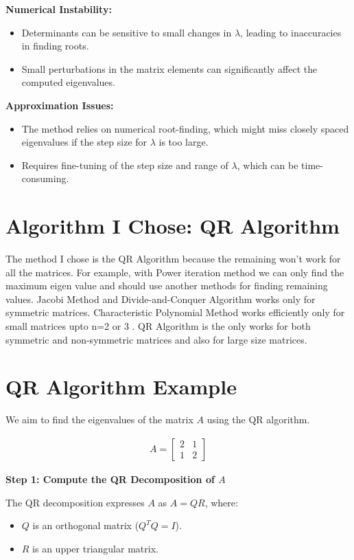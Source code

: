 \documentclass[journal]{IEEEtran}
\begin{document}
\begin{enumerate}
\textbf{Numerical Instability:}
\begin{itemize}
    \item Determinants can be sensitive to small changes in $\lambda$, leading to inaccuracies in finding roots.
    \item Small perturbations in the matrix elements can significantly affect the computed eigenvalues.
\end{itemize}

\textbf{Approximation Issues:}
\begin{itemize}
    \item The method relies on numerical root-finding, which might miss closely spaced eigenvalues if the step size for $\lambda$ is too large.
    \item Requires fine-tuning of the step size and range of $\lambda$, which can be time-consuming.
\end{itemize}

\section{Algorithm I Chose: QR Algorithm}
The method I chose is the QR Algorithm because the remaining won't work for all the matrices. For example, with Power iteration method we can only find the maximum eigen value and should use another methods for finding remaining values. Jacobi Method and Divide-and-Conquer Algorithm works only for symmetric matrices. Characteristic Polynomial Method works efficiently only for small matrices upto n=2 or 3 . QR Algorithm is the only works for both symmetric and non-symmetric matrices and also for large size matrices. 

    \section*{QR Algorithm Example}

We aim to find the eigenvalues of the matrix $A$ using the QR algorithm.

\begin{align}
    A = \begin{bmatrix} 2 & 1 \\ 1 & 2 \end{bmatrix}
\end{align}



\textbf{Step 1: Compute the QR Decomposition of $A$}

The QR decomposition expresses $A$ as $A = QR$, where:
\begin{itemize}
    \item $Q$ is an orthogonal matrix ($Q^T Q = I$).
    \item $R$ is an upper triangular matrix.
\end{itemize}


\end{enumerate}
\end{document}
